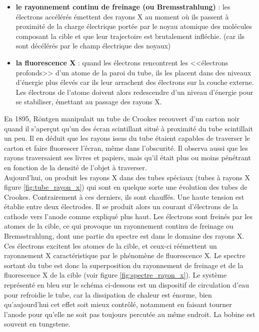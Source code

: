 \begin{itemize}
    \item \textbf{le rayonnement continu de freinage (ou Bremsstrahlung)} : les électrons accélérés émettent des rayons X au moment où ils passent à proximité de la charge électrique portée par le noyau atomique des molécules composant la cible et que leur trajectoire est brutalement infléchie. (car ils sont décélérés par le champ électrique des noyaux)
    \item \textbf{la fluorescence X} : quand les électrons rencontrent les <<électrons profonds>> d'un atome de la paroi du tube, ils les placent dans des niveaux d'énergie plus élevés car ils leur arrachent des électrons sur la couche externe. Les électrons de l'atome doivent alors redescendre d'un niveau d'énergie pour se stabiliser, émettant au passage des rayons X.
\end{itemize}

En 1895, Röntgen manipulait un tube de Crookes recouvert d'un carton noir quand il s'aperçut qu'un des écran scintillant situé à proximité du tube scintillait un peu. Il en déduit que les rayons issus du tube étaient capables de traverser le carton et faire fluorescer l'écran, même dans l'obscurité. Il observa aussi que les rayons traversaient ses livres et papiers, mais qu'il était plus ou moins pénétrant en fonction de la densité de l'objet à traverser. \\

Aujourd'hui, on produit les rayons X dans des tubes spéciaux (tubes à rayons X figure \ref{fig:tube_rayon_x}) qui sont en quelque sorte une évolution des tubes de Crookes. Contrairement à ces derniers, ils sont chauffés. Une haute tension est établie entre deux électrodes. Il se produit alors un courant d'électrons de la cathode vers l'anode comme expliqué plus haut. Les électrons sont freinés par les atomes de la cible, ce qui provoque un rayonnement continu de freinage ou Bremsstrahlung, dont une partie du spectre est dans le domaine des rayons X. Ces électrons excitent les atomes de la cible, et ceux-ci réémettent un rayonnement X caractéristique par le phénomène de fluorescence X. Le spectre sortant du tube est donc la superposition du rayonnement de freinage et de la fluorescence X de la cible (voir figure \ref{fig:spectre_rayon_x}). Le système représenté en bleu sur le schéma ci-dessous est un dispositif de circulation d'eau pour refroidie le tube, car la dissipation de chaleur est énorme, bien qu'aujourd'hui cet effet soit mieux contrôlé, notamment en faisant tourner l'anode pour qu'elle ne soit pas toujours percutée au même endroit. La bobine est souvent en tungstene.

